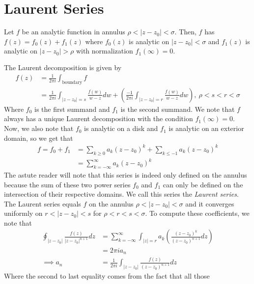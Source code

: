 \documentclass[11pt,leqno,oneside]{amsart}
\numberwithin{thm}{section}
\begin{document}
  \section*{Laurent Series}
  \begin{defn}
    Let $f$ be an analytic function in annulus $\rho < |z-z_0| <
    \sigma$. Then, $f$ has  $f(z) = f_0(z)
    + f_1(z)$ where $f_0(z)$ is analytic on $|z-z_0| < \sigma$ and
    $f_1(z)$ is analytic on $|z-z_0| > \rho$ with normalization $f_1(\infty) = 0$.
  \end{defn}
  The Laurent decomposition is given by
  \begin{align*}
    f(z) & = \frac{1}{2 \pi i} \int_{\text{boundary}} f \\
    \ & = \frac{1}{2 \pi i} \int_{|z-z_0| = s} \frac{f(w)}{w-z} dw +
        \left( \frac{-1}{2 \pi i} \int_{|z-z_0| = r}
        \frac{f(w)}{w-z}dw \right), \ \rho < s < r < \sigma
  \end{align*}
  Where $f_0$ is the first summand and $f_1$ is the second
  summand. We note that $f$ always has a unique Laurent decomposition
  with the condition $f_1(\infty) = 0$. Now, we also note that $f_0$
  is analytic on a disk and $f_1$ is analytic on an exterior domain,
  so we get that
  \begin{align*}
    f = f_0+f_1 & = \sum_{k \geq 0} a_k(z-z_0)^k + \sum_{k \leq -1}
                  a_k(z-z_0)^k \\
    \ & = \sum_{k=-\infty}^\infty a_k(z-z_0)^k
  \end{align*}
  The astute reader will note that this series is indeed only defined
  on the annulus because the sum of these two power series $f_0$ and
  $f_1$ can only be defined on the intersection of their respective
  domains. We call this series the \emph{Laurent series}. The Laurent
  series equals $f$ on the annulus $\rho < |z-z_0| < \sigma$ and it
  converges uniformly on $r < |z-z_0| < s$ for $\rho < r < s <
  \sigma$. To compute these coefficients, we note that
  \begin{align*}
    \oint_{|z-z_0|} \frac{f(z)}{|z-z_0|^{n+1}} dz
    & = \sum_{k=-\infty}^\infty \int_{|z|=r} a_k \left(
      \frac{(z-z_0)^k}{(z-z_0)^{n+1}} dz \right) \\
    \ & = 2 \pi i a_n \\
    \implies a_n & = \frac{1}{2 \pi i} \int_{|z-z_0|}
                 \frac{f(z)}{(z-z_0)^{n+1}}dz
  \end{align*}
  Where the second to last equality comes from the fact that all those
\end{document}
